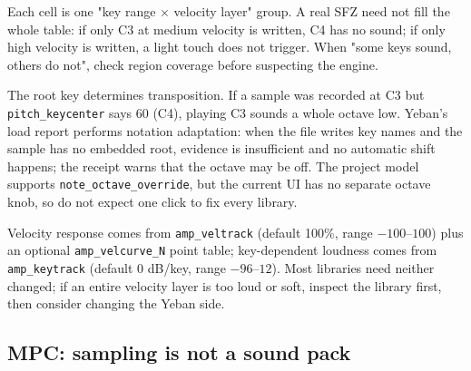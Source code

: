 \begin{center}
\end{center}

Each cell is one "key range × velocity layer" group. A real SFZ need not fill the whole table: if only C3 at medium velocity is written, C4 has no sound; if only high velocity is written, a light touch does not trigger. When "some keys sound, others do not", check region coverage before suspecting the engine.

The root key determines transposition. If a sample was recorded at C3 but \texttt{pitch\_keycenter} says 60 (C4), playing C3 sounds a whole octave low. Yeban's load report performs notation adaptation: when the file writes key names and the sample has no embedded root, evidence is insufficient and no automatic shift happens; the receipt warns that the octave may be off. The project model supports \texttt{note\_octave\_override}, but the current UI has no separate octave knob, so do not expect one click to fix every library.

Velocity response comes from \texttt{amp\_veltrack} (default 100\%, range $-100$–$100$) plus an optional \texttt{amp\_velcurve\_N} point table; key-dependent loudness comes from \texttt{amp\_keytrack} (default 0 dB/key, range $-96$–$12$). Most libraries need neither changed; if an entire velocity layer is too loud or soft, inspect the library first, then consider changing the Yeban side.

\subsection{MPC: sampling is not a sound pack}

